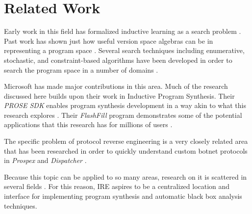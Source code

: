 \chapter{Related Work}

Early work in this field has formalized inductive learning as a search problem \cite{mitchell1982generalization}.
Past work has shown just how useful version space algebras can be in representing a program space \cite{hirsh1991theoretical, lau2000version, lau2003programming}.
Several search techniques including enumerative, stochastic, and constraint-based algorithms have been developed in order to search the program space in a number of domains \cite{udupa2013transit, schkufza2013stochastic, solar2008program, feser2015synthesizing}.

Microsoft has made major contributions in this area.
Much of the research discussed here builds upon their work in Inductive Program Synthesis.
Their \textit{PROSE SDK} enables program synthesis development in a way akin to what this research explores \cite{gulwani2016programming}.
Their \textit{FlashFill} program demonstrates some of the potential applications that this research has for millions of users \cite{gulwani2011automating, gulwani2015inductive}.

The specific problem of protocol reverse engineering is a very closely related area that has been researched in order to quickly understand custom botnet protocols in \textit{Prospex} and \textit{Dispatcher} \cite{comparetti2009prospex, caballero2009dispatcher}.

Because this topic can be applied to so many areas, research on it is scattered in several fields \cite{kitzelmann2009inductive}.
For this reason, IRE aspires to be a centralized location and interface for implementing program synthesis and automatic black box analysis techniques.
